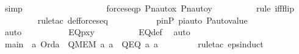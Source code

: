\begin{isabellebody}
\ simp\ \isanewline
\ \ \ \ \ \ \isamarkupfalse%
\isanewline
\ \ \ \ \ \ \isamarkupfalse%
\ \isamarkupfalse%
\ {\isachardoublequoteopen}{\isachardot}{\kern0pt}{\isachardot}{\kern0pt}{\isachardot}{\kern0pt}\ {\isasymlongleftrightarrow}\ forces{\isacharunderscore}{\kern0pt}eq{\isacharparenleft}{\kern0pt}{\isasympi}{\isacharbackquote}{\kern0pt}p{\isacharcomma}{\kern0pt}\ Pn{\isacharunderscore}{\kern0pt}auto{\isacharparenleft}{\kern0pt}{\isasympi}{\isacharparenright}{\kern0pt}{\isacharbackquote}{\kern0pt}x{\isacharcomma}{\kern0pt}\ Pn{\isacharunderscore}{\kern0pt}auto{\isacharparenleft}{\kern0pt}{\isasympi}{\isacharparenright}{\kern0pt}{\isacharbackquote}{\kern0pt}y{\isacharparenright}{\kern0pt}{\isachardoublequoteclose}\ \isanewline
\ \ \ \ \ \ \ \ \isamarkupfalse%
{\isacharparenleft}{\kern0pt}rule\ iff{\isacharunderscore}{\kern0pt}flip{\isacharparenright}{\kern0pt}\isanewline
\ \ \ \ \ \ \ \ \isamarkupfalse%
{\isacharparenleft}{\kern0pt}rule{\isacharunderscore}{\kern0pt}tac\ def{\isacharunderscore}{\kern0pt}forces{\isacharunderscore}{\kern0pt}eq{\isacharparenright}{\kern0pt}\ \isanewline
\ \ \ \ \ \ \ \ \isamarkupfalse%
\ pinP\ piauto\ P{\isacharunderscore}{\kern0pt}auto{\isacharunderscore}{\kern0pt}value\ \isanewline
\ \ \ \ \ \ \ \ \isamarkupfalse%
\ auto\ \isanewline
\ \ \ \ \ \ \isamarkupfalse%
\ \isamarkupfalse%
\ {\isachardoublequoteopen}EQ{\isacharparenleft}{\kern0pt}p{\isacharcomma}{\kern0pt}x{\isacharcomma}{\kern0pt}y{\isacharparenright}{\kern0pt}{\isachardoublequoteclose}\isanewline
\ \ \ \ \ \ \ \ \isamarkupfalse%
\ EQ{\isacharunderscore}{\kern0pt}def\ \isamarkupfalse%
\ auto\ \isanewline
\ \ \ \ \isamarkupfalse%
\isanewline
\isanewline
\ \ \ \ \isamarkupfalse%
\ main\ {\isacharcolon}{\kern0pt}\ {\isachardoublequoteopen}{\isasymAnd}a{\isachardot}{\kern0pt}\ Ord{\isacharparenleft}{\kern0pt}a{\isacharparenright}{\kern0pt}\ {\isasymlongrightarrow}\ Q{\isacharparenleft}{\kern0pt}MEM{\isacharcomma}{\kern0pt}\ a{\isacharcomma}{\kern0pt}\ a{\isacharparenright}{\kern0pt}\ {\isasymand}\ Q{\isacharparenleft}{\kern0pt}EQ{\isacharcomma}{\kern0pt}\ a{\isacharcomma}{\kern0pt}\ a{\isacharparenright}{\kern0pt}{\isachardoublequoteclose}\ \isanewline
\ \ \ \ \ \ \isamarkupfalse%
\ {\isacharparenleft}{\kern0pt}rule{\isacharunderscore}{\kern0pt}tac\ eps{\isacharunderscore}{\kern0pt}induct{\isacharparenright}{\kern0pt}\ \isanewline

\end{isabellebody}
